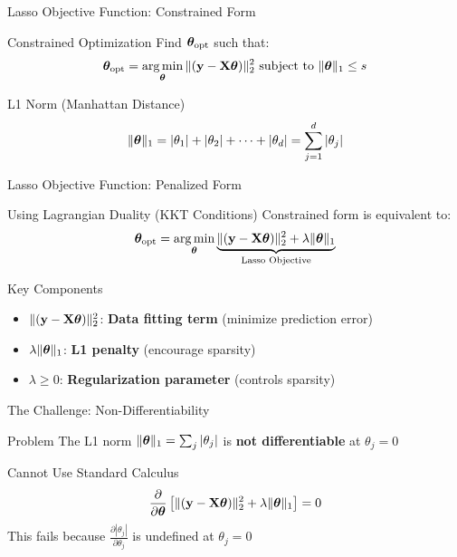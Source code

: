 \documentclass{beamer}
\begin{document}
\begin{frame}{Lasso Objective Function: Constrained Form}
\begin{definitionbox}{Constrained Optimization}
Find $\boldsymbol{\theta}_{\text{opt}}$ such that:
$$\boldsymbol{\theta}_{\text{opt}} = \operatorname*{arg\,min}_{\boldsymbol{\theta}} \|(\mathbf{y}-\mathbf{X}\boldsymbol{\theta})\|_2^2 \text{ subject to } \|\boldsymbol{\theta}\|_1 \leq s$$
\end{definitionbox}
\pause

\begin{codebox}{L1 Norm (Manhattan Distance)}
$$\|\boldsymbol{\theta}\|_1 = |\theta_1| + |\theta_2| + \cdots + |\theta_d| = \sum_{j=1}^d |\theta_j|$$
\end{codebox}
\end{frame}

\begin{frame}{Lasso Objective Function: Penalized Form}
\begin{theorembox}{Using Lagrangian Duality (KKT Conditions)}
Constrained form is equivalent to:
$$\boldsymbol{\theta}_{\text{opt}} = \operatorname*{arg\,min}_{\boldsymbol{\theta}} \underbrace{\|(\mathbf{y}-\mathbf{X}\boldsymbol{\theta})\|_2^2 + \lambda \|\boldsymbol{\theta}\|_1}_{\text{Lasso Objective}}$$
\end{theorembox}
\pause

\begin{keypointsbox}{Key Components}
\begin{itemize}
\item $\|(\mathbf{y}-\mathbf{X}\boldsymbol{\theta})\|_2^2$: \textbf{Data fitting term} (minimize prediction error)
\item $\lambda \|\boldsymbol{\theta}\|_1$: \textbf{L1 penalty} (encourage sparsity)
\item $\lambda \geq 0$: \textbf{Regularization parameter} (controls sparsity)
\end{itemize}
\end{keypointsbox}
\end{frame}

\begin{frame}{The Challenge: Non-Differentiability}
\begin{alertbox}{Problem}
The L1 norm $\|\boldsymbol{\theta}\|_1 = \sum_j |\theta_j|$ is \textbf{not differentiable} at $\theta_j = 0$
\end{alertbox}
\pause

\begin{codebox}{Cannot Use Standard Calculus}
$$\frac{\partial}{\partial \boldsymbol{\theta}} \left[ \|(\mathbf{y}-\mathbf{X}\boldsymbol{\theta})\|_2^2 + \lambda \|\boldsymbol{\theta}\|_1 \right] = 0$$
This fails because $\frac{\partial |\theta_j|}{\partial \theta_j}$ is undefined at $\theta_j = 0$
\end{codebox}
\end{frame}
\end{document}
